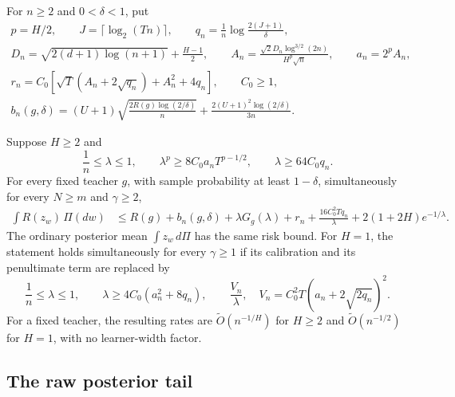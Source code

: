 For $n\geq2$ and $0<\delta<1$, put
\begin{gather*}
 p=H/2,\qquad J=\lceil\log_2(Tn)\rceil,\qquad
 q_n=\frac1n\log\frac{2(J+1)}\delta,\\
 D_n=\sqrt{2(d+1)\log(n+1)}+\frac{H-1}{2},\qquad
 A_n=\frac{\sqrt2D_n\log^{3/2}(2n)}{H^p\sqrt n},\qquad
 a_n=2^p A_n,\\
 r_n=C_0\left[\sqrt T(A_n+2\sqrt{q_n})+A_n^2+4q_n\right],
 \qquad C_0\geq1,\\
 b_n(g,\delta)=(U+1)\sqrt{\frac{2R(g)\log(2/\delta)}n}
       +\frac{2(U+1)^2\log(2/\delta)}{3n}.
\end{gather*}

\begin{theorem}
\label{thm:fixed-raw-oracle}
Suppose $H\geq2$ and
\[
 \frac1n\leq\lambda\leq1,\qquad
 \lambda^p\geq8C_0a_nT^{p-1/2},\qquad
 \lambda\geq64C_0q_n.
\]
For every fixed teacher $g$, with sample probability at least
$1-\delta$, simultaneously for every $N\geq m$ and $\gamma\geq2$,
\begin{align}
 \int R(z_w)\,\Pi(dw)
 &\leq R(g)+b_n(g,\delta)+\lambda G_g(\lambda)+r_n
       +\frac{16C_0^2Tq_n}{\lambda}
       +2(1+2H)e^{-1/\lambda}.
 \label{eq:fixed-raw-oracle}
\end{align}
The ordinary posterior mean $\int z_w\,d\Pi$ has the same risk bound.
For $H=1$, the statement holds simultaneously for every $\gamma\geq1$
if its calibration and its penultimate term are replaced by
\[
 \frac1n\leq\lambda\leq1,\qquad
 \lambda\geq4C_0(a_n^2+8q_n),\qquad
 \frac{V_n}{\lambda},\quad
 V_n=C_0^2T(a_n+2\sqrt{2q_n})^2.
\]
For a fixed teacher, the resulting rates are
$\widetilde O(n^{-1/H})$ for $H\geq2$ and
$\widetilde O(n^{-1/2})$ for $H=1$, with no learner-width factor.
\end{theorem}

\subsection{The raw posterior tail}

